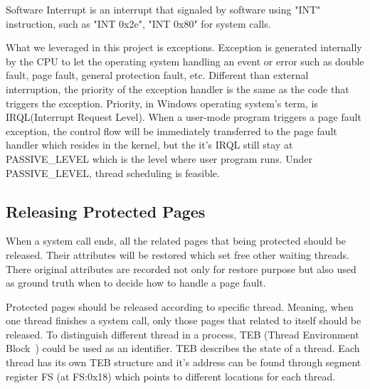 Software Interrupt is an interrupt that signaled by software using "INT" instruction, such as "INT 0x2e", "INT 0x80" for system calls. 

What we leveraged in this project is exceptions. Exception is generated internally by the CPU to let the operating system handling an event or error such as double fault, page fault, general protection fault, etc. Different than external interruption, the priority of the exception handler is the same as the code that triggers the exception. Priority, in Windows operating system's term, is IRQL(Interrupt Request Level). When a user-mode program triggers a page fault exception, the control flow will be immediately transferred to the page fault handler which resides in the kernel, but the it's IRQL still stay at PASSIVE_LEVEL which is the level where user program runs. Under PASSIVE_LEVEL, thread scheduling is feasible.

\subsection{Releasing Protected Pages}

When a system call ends, all the related pages that being protected should be released. Their attributes will be restored which set free other waiting threads. There original attributes are recorded not only for restore purpose but also used as ground truth when to decide how to handle a page fault.


\begin{comment}
\begin{figure}[th]
  \texttt{[image: timeline]}
  \centering
  \caption{The page protection period is within one system call cycle, this is based on the fact that kernel TOCTOU vulnerability does not happen across system calls.}
  \label{fig:timeline}
\end{figure}
\end{comment}




Protected pages should be released according to specific thread. Meaning, when one thread finishes a system call, only those pages that related to itself should be released. To distinguish different thread in a process, TEB (Thread Environment Block~\cite{teb}) could be used as an identifier. TEB describes the state of a thread. Each thread has its own TEB structure and it's address can be found through segment register FS (at FS:0x18) which points to different locations for each thread. 

